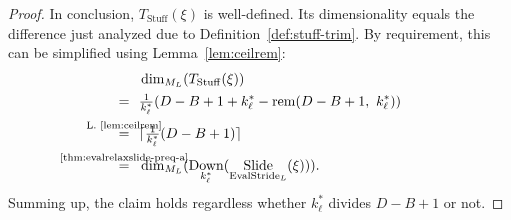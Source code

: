 \documentclass[journal]{IEEEtran}
\newcommand{\ROI}{B}
\newcommand{\nceil}[1]{\lceil #1 \rceil}
\DeclareMathOperator{\Slide}{Slide}
\DeclareMathOperator{\EvalStride}{EvalStride}
\DeclareMathOperator{\Stuffing}{Stuff}
\newcommand{\rem}[2]{\operatorname{rem}(#1,\ #2)}
\newcommand{\equsing}[1]{\overset{\mathclap{\text{#1}}}{=}}
\DeclareMathOperator{\Downsampling}{Down}
\begin{document}
\begin{proof}
In conclusion, $T_{\Stuffing}(\xi)$ is well-defined.
Its dimensionality equals the difference just analyzed due to Definition~\ref{def:stuff-trim}.
By requirement, this can be simplified using Lemma~\ref{lem:ceilrem}:
\begin{align*}
  & \dim_{M_L}( T_{\Stuffing}(\xi) )\\
  =\ \ & \tfrac{1}{k_\ell^*}(D - \ROI + 1 + k_\ell^* - \rem{D - \ROI + 1}{k_\ell^*})\\
  \equsing{L.~\ref{lem:ceilrem}}\ \ & \nceil{\tfrac{1}{k_\ell^*}( D - \ROI + 1 )}\\
  \equsing{\ref{thm:evalrelaxslide-preq-a}}\ \ & \dim_{M_L}( \Downsampling_{k_\ell^*}( \Slide_{\EvalStride_L}(\xi) ) )\text{.}
\end{align*}
Summing up, the claim holds regardless whether $k_\ell^*$ divides $D - \ROI + 1$ or not.


\end{proof}
\end{document}

